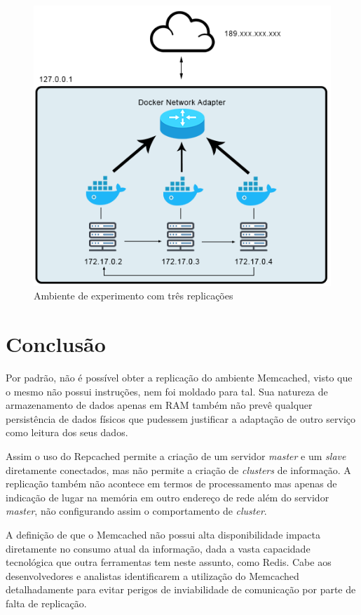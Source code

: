 \documentclass[conference]{IEEEtran}
\begin{document}
\begin{figure}[h!]
\centerline{\includegraphics[width=1\linewidth]{figura3.png}}
\caption{Ambiente de experimento com três replicações}
\label{fig}
\end{figure}

\section{Conclusão}

Por padrão, não é possível obter a replicação do ambiente Memcached, visto que o mesmo não possui instruções, nem foi moldado para tal. Sua natureza de armazenamento de dados apenas em RAM também não prevê qualquer persistência de dados físicos que pudessem justificar a adaptação de outro serviço como leitura dos seus dados.

Assim o uso do Repcached permite a criação de um servidor \textit{master} e um \textit{slave} diretamente conectados, mas não permite a criação de \textit{clusters} de informação. A replicação também não acontece em termos de processamento mas apenas de indicação de lugar na memória em outro endereço de rede além do servidor \textit{master}, não configurando assim o comportamento de \textit{cluster}.

A definição de que o Memcached não possui alta disponibilidade impacta diretamente no consumo atual da informação, dada a vasta capacidade tecnológica que outra ferramentas tem neste assunto, como Redis. Cabe aos desenvolvedores e analistas identificarem a utilização do Memcached detalhadamente para evitar perigos de inviabilidade de comunicação por parte de falta de replicação.


\renewcommand{\refname}{Referências}

\end{document}
